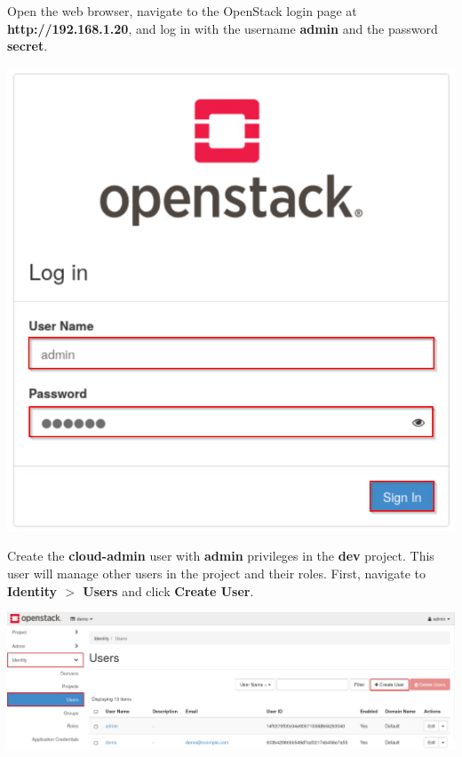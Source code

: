 \documentclass[letterpaper, 12pt]{article}
\begin{document}
\begin{enumerate}
    \begin{labstep}
        Open the web browser, navigate to the OpenStack login page at \textbf{http://192.168.1.20}, and log in with the username \textbf{admin} and the password \textbf{secret}.

        \begin{center}
            \includegraphics[scale=0.5]{images/part3/step1.png}
        \end{center}
    \end{labstep}

    \begin{labstep}
        Create the \textbf{cloud-admin} user with \textbf{admin} privileges in the \textbf{dev} project.
        This user will manage other users in the project and their roles.
        First, navigate to \textbf{Identity $>$ Users} and click \textbf{Create User}.

        \begin{center}
            \includegraphics[width=\linewidth]{images/part3/step2.png}
        \end{center}
    \end{labstep}


\end{enumerate}
\end{document}
